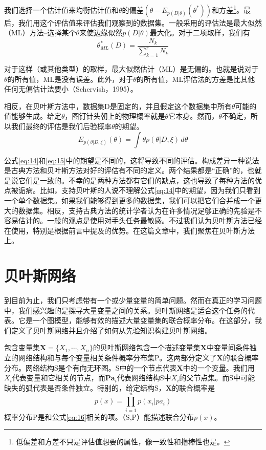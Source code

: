 \documentclass[10pt,a4paper]{article}
\begin{document}
\begin{CJK*}{UTF8}{gkai}
我们选择一个估计值来均衡估计值和$\theta$的偏差$(\theta-E_{p(D|\theta)}(\theta^*))$和方差\footnote{低偏差和方差不只是评估值想要的属性，像一致性和撸棒性也是。}。最后，我们用这个评估值来评估我们观察到的数据集。一般采用的评估法是最大似然（ML）方法--选择某个$\theta$来使边缘似然$p(D|\theta)$最大化。对于二项取样，我们有
\begin{equation}
\theta_{ML}^*(D)=\frac{N_k}{\sum_{k=1}^r N_k} \nonumber
\end{equation}


对于这样（或其他类型）的取样，最大似然估计（ML）是无偏的。也就是说对于$\theta$的所有值，ML是没有误差。此外，对于$\theta$的所有值，ML评估法的方差是比其他任何无偏估计法要小（Schervish，1995）。

相反，在贝叶斯方法中，数据集D是固定的，并且假定这个数据集中所有$\theta$可能的值能够生成。给定$\theta$，图钉针头朝上的物理概率就是$\theta$它本身。然而，$\theta$不确定，所以我们最终的评估是我们后验概率$\theta$的期望。
\begin{equation}
\label{eq:15}
E_{p(\theta|D,\xi)}(\theta)=\int\theta p(\theta|D,\xi)\, d\theta
\end{equation}


公式\ref{eq:14}和\ref{eq:15}中的期望是不同的，这将导致不同的评估。构成差异一种说法是古典方法和贝叶斯方法对好的评估有不同的定义。两个结果都是“正确”的，也就是说它们是一致的。不幸的是两种方法都有它们的缺点，这也导致了每种方法的优点被诟病。比如，支持贝叶斯的人说不理解公式\ref{eq:14}中的期望，因为我们只看到一个单个数据集。如果我们能够得到更多的数据集，我们可以把它们合并成一个更大的数据集。相反，支持古典方法的统计学者认为在许多情况足够正确的先验是不容易估计的。一般的观点是使用对手头任务最敏感。不过我们认为贝叶斯方法已经在使用，特别是根据前言中提及的优势。在这篇文章中，我们聚焦在贝叶斯方法上。


\section{贝叶斯网络}
到目前为止，我们只考虑带有一个或少量变量的简单问题。然而在真正的学习问题中，我们感兴趣的是探寻大量变量之间的关系。贝叶斯网络是适合这个任务的代表。它是一个图模型，能够有效的描述大量变量集的联合概率分布。在这部分，我们定义了贝叶斯网络并且介绍了如何从先验知识构建贝叶斯网络。


包含变量集$\boldsymbol{X}=\{X_1,\cdots,X_n\}$的贝叶斯网络包含一个描述变量集$\boldsymbol{X}$中变量间条件独立的网络结构和与每个变量相关条件概率分布集P。这两部分定义了$\boldsymbol{X}$的联合概率分布。网络结构S是个有向无环图。S中的一个节点代表$\boldsymbol{X}$中的一个变量。我们用$X_i$代表变量和它相关的节点，而$\boldsymbol{Pa}_i$代表网络结构S中$X_i$的父节点集。而S中可能缺失的弧代表是否条件独立。特别的，给定结构S，$\boldsymbol{X}$的联合概率是
\begin{equation}
\label{eq:16}
p(x)=\prod_{i=1}^n p(x_i|pa_i)
\end{equation}
概率分布P是和公式\ref{eq:16}相关的项。（S,P）能描述联合分布$p(x)$。



\end{CJK*}
\end{document}
